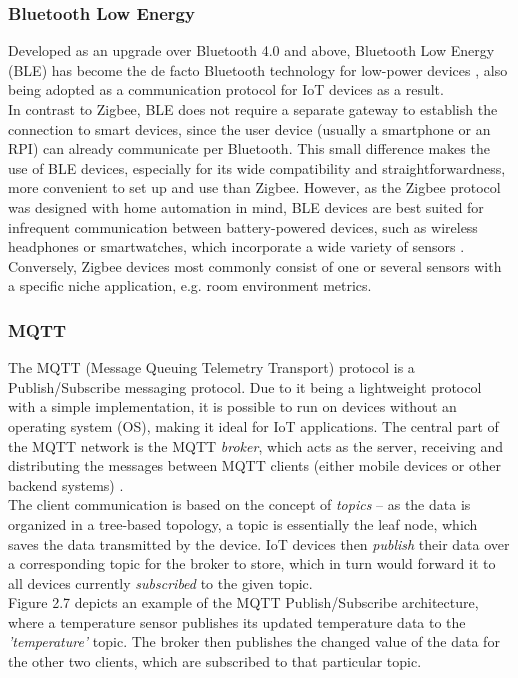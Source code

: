 \subsubsection{Bluetooth Low Energy}
Developed as an upgrade over Bluetooth 4.0 and above, Bluetooth Low Energy (BLE) has become the de facto Bluetooth technology for low-power devices \cite{bluetooth_le}, also being adopted as a communication protocol for IoT devices as a result.\\
In contrast to Zigbee, BLE does not require a separate gateway to establish the connection to smart devices, since the user device (usually a smartphone or an RPI) can already communicate per Bluetooth. This small difference makes the use of BLE devices, especially for its wide compatibility and straightforwardness, more convenient to set up and use than Zigbee. However, as the Zigbee protocol was designed with home automation in mind, BLE devices are best suited for infrequent communication between battery-powered devices, such as wireless headphones or smartwatches, which incorporate a wide variety of sensors \cite{bluetooth_v_zigbee}. Conversely, Zigbee devices most commonly consist of one or several sensors with a specific niche application, e.g. room environment metrics.

\subsubsection{MQTT}
The MQTT (Message Queuing Telemetry Transport) protocol is a Publish/Subscribe messaging protocol. Due to it being a lightweight protocol with a simple implementation, it is possible to run on devices without an operating system (OS), making it ideal for IoT applications. The central part of the MQTT network is the MQTT \textit{broker}, which acts as the server, receiving and distributing the messages between MQTT clients (either mobile devices or other backend systems) \cite{aigner_hacking_2018}.\\
The client communication is based on the concept of \textit{topics} -- as the data is organized in a tree-based topology, a topic is essentially the leaf node, which saves the data transmitted by the device. IoT devices then \textit{publish} their data over a corresponding topic for the broker to store, which in turn would forward it to all devices currently \textit{subscribed} to the given topic.\\
Figure 2.7 depicts an example of the MQTT Publish/Subscribe architecture, where a temperature sensor publishes its updated temperature data to the \textit{'temperature'} topic. The broker then publishes the changed value of the data for the other two clients, which are subscribed to that particular topic. 

